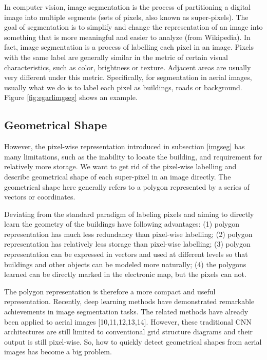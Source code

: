 In computer vision, image segmentation is the process of partitioning a digital image into multiple segments (sets of pixels, also known as super-pixels). The goal of segmentation is to simplify and change the representation of an image into something that is more meaningful and easier to analyze (from Wikipedia). In fact, image segmentation is a process of labelling each pixel in an image. Pixels with the same label are generally similar in the metric of certain visual characteristics, such as color, brightness or texture. Adjacent areas are usually very different under this metric. Specifically, for segmentation in aerial images, usually what we do is to label each pixel as buildings, roads or background. Figure \ref{fig:egarlimgseg} shows an example.



\subsection{Geometrical Shape}\label{geosha}

However, the pixel-wise representation introduced in subsection \ref{imgseg} has many limitations, such as the inability to locate the building, and requirement for relatively more storage. We want to get rid of the pixel-wise labelling and describe geometrical shape of each super-pixel in an image directly. The geometrical shape here generally refers to a polygon represented by a series of vectors or coordinates.

Deviating from the standard paradigm of labeling pixels and aiming to directly learn the geometry of the buildings have following advantages: (1) polygon representation has much less redundancy than pixel-wise labelling; (2) polygon representation has relatively less storage than pixel-wise labelling; (3) polygon representation can be expressed in vectors and used at different levels so that buildings and other objects can be modeled more naturally; (4) the polygons learned can be directly marked in the electronic map, but the pixels can not.

The polygon representation is therefore a more compact and useful representation. Recently, deep learning methods have demonstrated remarkable achievements in image segmentation tasks. The related methods have already been applied to aerial images [10,11,12,13,14]. However, these traditional CNN architectures are still limited to conventional grid structure diagrams and their output is still pixel-wise. So, how to quickly detect geometrical shapes from aerial images has become a big problem.

